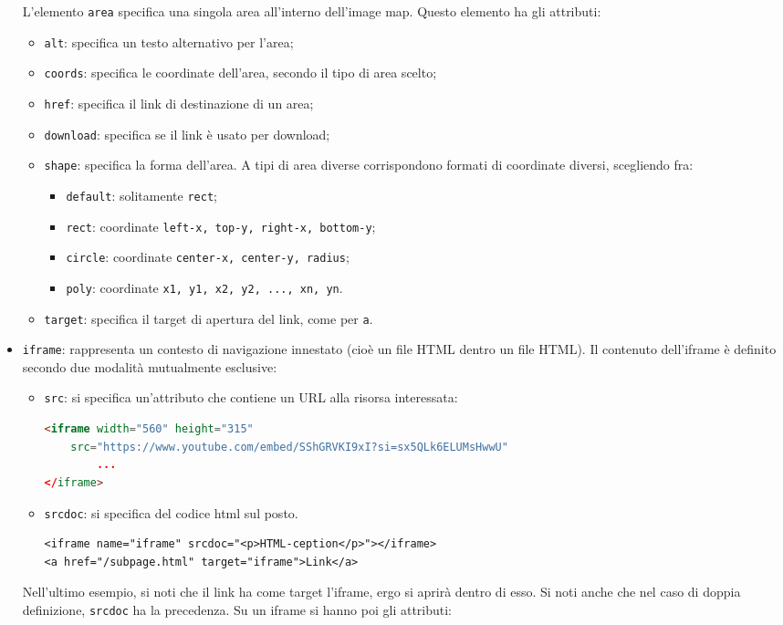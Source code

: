 \documentclass[a4paper,11pt]{article}
\begin{document}
\begin{itemize}
L'elemento \lstinline|area| specifica una singola area all'interno dell'image map.
Questo elemento ha gli attributi:
\begin{itemize}
	\item \lstinline|alt|: specifica un testo alternativo per l'area;
	\item \lstinline|coords|: specifica le coordinate dell'area, secondo il tipo di area scelto;
	\item \lstinline|href|: specifica il link di destinazione di un area;
	\item \lstinline|download|: specifica se il link è usato per download;
	\item \lstinline|shape|: specifica la forma dell'area. A tipi di area diverse corrispondono formati di coordinate diversi, scegliendo fra:
		\begin{itemize}
			\item \lstinline|default|: solitamente \lstinline|rect|;
			\item \lstinline|rect|: coordinate \lstinline|left-x, top-y, right-x, bottom-y|;
			\item \lstinline|circle|: coordinate \lstinline|center-x, center-y, radius|;
			\item \lstinline|poly|: coordinate \lstinline|x1, y1, x2, y2, ..., xn, yn|.
		\end{itemize}
	\item \lstinline|target|: specifica il target di apertura del link, come per \lstinline|a|.
\end{itemize}

\item \lstinline|iframe|: rappresenta un contesto di navigazione innestato (cioè un file HTML dentro un file HTML). 
	Il contenuto dell'iframe è definito secondo due modalità mutualmente esclusive:
	\begin{itemize}
		\item \lstinline|src|: si specifica un'attributo che contiene un URL alla risorsa interessata:
\begin{lstlisting}[language=html, style=codestyle]	
<iframe width="560" height="315" 
    src="https://www.youtube.com/embed/SShGRVKI9xI?si=sx5QLk6ELUMsHwwU" 
		...
</iframe>
\end{lstlisting}
		\item \lstinline|srcdoc|: si specifica del codice html sul posto.
\begin{lstlisting}	
<iframe name="iframe" srcdoc="<p>HTML-ception</p>"></iframe>
<a href="/subpage.html" target="iframe">Link</a>
\end{lstlisting}
	\end{itemize}
	Nell'ultimo esempio, si noti che il link ha come target l'iframe, ergo si aprirà dentro di esso.
	Si noti anche che nel caso di doppia definizione, \lstinline|srcdoc| ha la precedenza.
	Su un iframe si hanno poi gli attributi:


\end{itemize}
\end{document}
